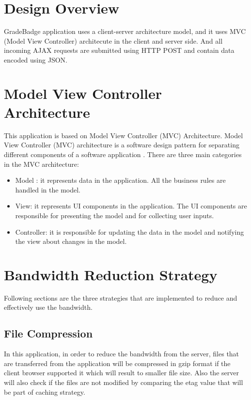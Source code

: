 
\section{Design Overview}
GradeBadge application uses a client-server architecture model, and it uses MVC (Model View Controller) architecute in the client and server side. And all incoming AJAX requests are submitted using HTTP POST and contain data encoded using JSON.    

\section{Model View Controller Architecture}
This application is based on Model View Controller (MVC) Architecture. Model View Controller (MVC) architecture is a software design pattern for separating different components of a software application \cite{MVC}. There are three main categories in the MVC architecture:

\begin{itemize}
\item Model : it represents data in the application. All the business rules are handled in the model.
\item View: it represents UI components in the application. The UI components are responsible for presenting the model and for collecting user inputs.
\item Controller: it is responsible for updating the data in the model and notifying the view about changes in the model.
\end{itemize}

\section{Bandwidth Reduction Strategy}
Following sections are the three strategies that are implemented to reduce and effectively use the bandwidth.  

\subsection{File Compression}
In this application, in order to reduce the bandwidth from the server, files that are transferred from the application  will be compressed in gzip format if the client browser supported it which will result to smaller file size. Also the server will also check if the files are not modified by comparing the etag value that will be part of caching strategy.

